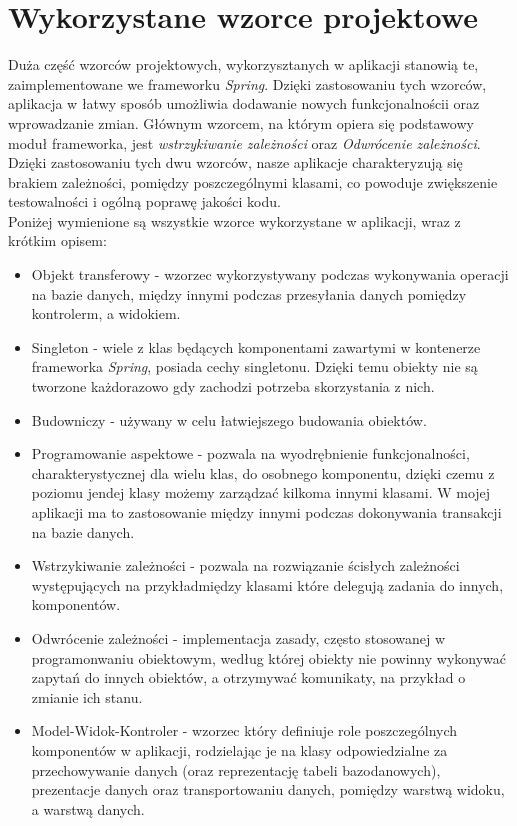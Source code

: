 \documentclass[a4paper, titlepage]{article}
\begin{document}
	\section{Wykorzystane wzorce projektowe}
	Duża część wzorców projektowych, wykorzysztanych w aplikacji stanowią te, zaimplementowane we frameworku \textit{Spring}. Dzięki zastosowaniu tych wzorców, aplikacja w łatwy sposób umożliwia dodawanie nowych funkcjonalnościi oraz wprowadzanie zmian. Głównym wzorcem, na którym opiera się podstawowy moduł frameworka, jest \textit{wstrzykiwanie zależności} oraz \textit{Odwrócenie zależności}. Dzięki zastosowaniu tych dwu wzorców, nasze aplikacje charakteryzują się brakiem zależności, pomiędzy poszczególnymi klasami, co powoduje zwiększenie testowalności i ogólną poprawę jakości kodu.
	\\Poniżej wymienione są wszystkie wzorce wykorzystane w aplikacji, wraz z krótkim opisem:
	\begin{itemize}
	\item Objekt transferowy - wzorzec wykorzystywany podczas wykonywania operacji na bazie danych, między innymi podczas przesyłania danych pomiędzy kontrolerm, a widokiem.
	\item Singleton - wiele z klas będących komponentami zawartymi w kontenerze frameworka \textit{Spring}, posiada cechy singletonu. Dzięki temu obiekty nie są tworzone każdorazowo gdy zachodzi potrzeba skorzystania z nich.
	\item Budowniczy - używany w celu łatwiejszego budowania obiektów.
	\item Programowanie aspektowe - pozwala na wyodrębnienie funkcjonalności, charakterystycznej dla wielu klas, do osobnego komponentu, dzięki czemu z poziomu jendej klasy możemy zarządzać kilkoma innymi klasami. W mojej aplikacji ma to zastosowanie między innymi podczas dokonywania transakcji na bazie danych.
	\item Wstrzykiwanie zależności - pozwala na rozwiązanie ścisłych zależności występujących na przykładmiędzy klasami które delegują zadania do innych, komponentów.
 	\item Odwrócenie zależności - implementacja zasady, często stosowanej w programonwaniu obiektowym, według której obiekty nie powinny wykonywać zapytań do innych obiektów, a otrzymywać komunikaty, na przykład o zmianie ich stanu.
	\item Model-Widok-Kontroler - wzorzec który definiuje role poszczególnych komponentów w aplikacji, rodzielając je na klasy odpowiedzialne za przechowywanie danych (oraz reprezentację tabeli bazodanowych), prezentacje danych oraz transportowaniu danych, pomiędzy warstwą widoku, a warstwą danych.
	\end{itemize}	
\end{document}
